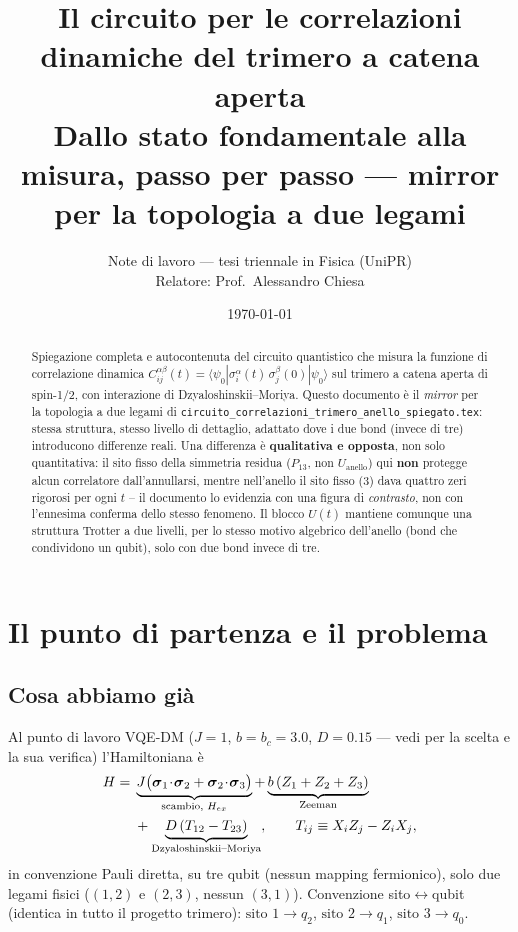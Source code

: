 \documentclass[11pt,a4paper]{article}
\title{Il circuito per le correlazioni dinamiche del trimero a catena aperta\\
\large Dallo stato fondamentale alla misura, passo per passo --- mirror per la topologia a due legami}
\author{Note di lavoro --- tesi triennale in Fisica (UniPR)\\
Relatore: Prof.\ Alessandro Chiesa}
\date{\today}
\begin{document}
\maketitle

\begin{abstract}
\noindent
Spiegazione completa e autocontenuta del circuito quantistico che misura la funzione di
correlazione dinamica $C_{ij}^{\alpha\beta}(t)=\langle\psi_0|\sigma_i^\alpha(t)\,
\sigma_j^\beta(0)|\psi_0\rangle$ sul trimero a catena aperta di spin-1/2, con interazione di
Dzyaloshinskii--Moriya. Questo documento è il \emph{mirror} per la topologia a due legami di
\texttt{circuito\_correlazioni\_trimero\_anello\_spiegato.tex}: stessa struttura, stesso livello di
dettaglio, adattato dove i due bond (invece di tre) introducono differenze reali. Una differenza è
\textbf{qualitativa e opposta}, non solo quantitativa: il sito fisso della simmetria residua
($P_{13}$, non $U_\text{anello}$) qui \textbf{non} protegge alcun correlatore dall'annullarsi,
mentre nell'anello il sito fisso (3) dava quattro zeri rigorosi per ogni $t$ -- il documento lo
evidenzia con una figura di \emph{contrasto}, non con l'ennesima conferma dello stesso fenomeno.
Il blocco $U(t)$ mantiene comunque una struttura Trotter a due livelli, per lo stesso motivo
algebrico dell'anello (bond che condividono un qubit), solo con due bond invece di tre.
\end{abstract}

\tableofcontents

\section{Il punto di partenza e il problema}

\subsection{Cosa abbiamo già}

Al punto di lavoro VQE-DM ($J=1$, $b=b_c=3.0$, $D=0.15$ --- vedi
\texttt{} per la scelta e la sua verifica)
l'Hamiltoniana è
\begin{align}
H ={}& \underbrace{J\big(\boldsymbol\sigma_1\!\cdot\!\boldsymbol\sigma_2
     + \boldsymbol\sigma_2\!\cdot\!\boldsymbol\sigma_3\big)}_{\text{scambio, }H_{ex}}
     + \underbrace{b\,(Z_1+Z_2+Z_3)}_{\text{Zeeman}} \notag\\
     &+ \underbrace{D\,(T_{12}-T_{23})}_{\text{Dzyaloshinskii--Moriya}},
     \qquad T_{ij}\equiv X_iZ_j-Z_iX_j,
\label{eq:H}
\end{align}
in convenzione Pauli diretta, su tre qubit (nessun mapping fermionico), solo due legami fisici
($(1,2)$ e $(2,3)$, nessun $(3,1)$). Convenzione sito$\leftrightarrow$qubit (identica in tutto il
progetto trimero): $\text{sito }1\to q_2$, $\text{sito }2\to q_1$, $\text{sito }3\to q_0$.
\end{document}
